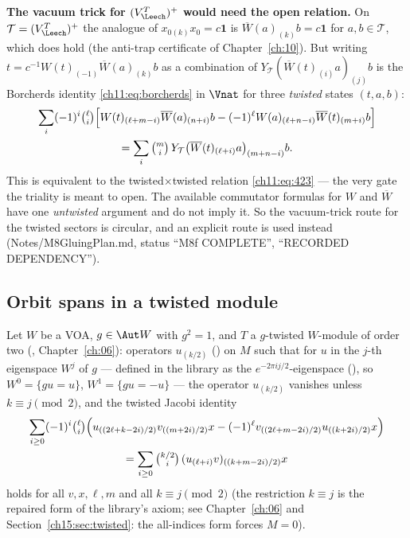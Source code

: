 \begin{warning}
\textbf{The vacuum trick for $(V_\Leech^T)^+$ would need the open relation.}  On $\mathcal
T=(V_\Leech^T)^+$ the analogue of $x_{0(k)}x_0=c\mathbf 1$ is $\overline W(a)_{(k)}b=c\mathbf 1$ for
$a,b\in\mathcal T$, which does hold (the anti-trap certificate 
of Chapter~\ref{ch:10}).  But writing $t=c^{-1}W(t)_{(-1)}\overline W(a)_{(k)}b$ as a combination of
$Y_{\mathcal T}(\overline W(t)_{(i)}a)_{(j)}b$ is the Borcherds identity \eqref{ch11:eq:borcherds} in
$\Vnat$ for three \emph{twisted} states $(t,a,b)$:
\begin{multline*}
  \sum_i(-1)^i\tbinom{\ell}{i}\Big[W(t)_{(\ell+m-i)}\overline W(a)_{(n+i)}b
   -(-1)^\ell W(a)_{(\ell+n-i)}\overline W(t)_{(m+i)}b\Big]\\
   =\sum_i\tbinom{m}{i}\,Y_{\mathcal T}\big(\overline W(t)_{(\ell+i)}a\big)_{(m+n-i)}b .
\end{multline*}
This is equivalent to the twisted$\times$twisted relation \eqref{ch11:eq:423} --- the very gate the
triality is meant to open.  The available commutator formulas for $W$ and $\overline W$ have one
\emph{untwisted} argument and do not imply it.  So the vacuum-trick route for the twisted sectors is
circular, and an explicit route is used instead (Notes/M8GluingPlan.md, status ``M8f COMPLETE'',
``RECORDED DEPENDENCY'').
\end{warning}

\subsection{Orbit spans in a twisted module}

Let $W$ be a VOA, $g\in\Aut W$ with $g^2=1$, and $T$ a $g$-twisted $W$-module of order two
(, Chapter~\ref{ch:06}): operators $u_{(k/2)}$ () on $M$
such that for $u$ in the $j$-th eigenspace $W^j$ of $g$ --- defined in the library as the
$e^{-2\pi i j/2}$-eigenspace (), so $W^0=\{gu=u\}$,
$W^1=\{gu=-u\}$ --- the operator $u_{(k/2)}$ vanishes unless $k\equiv j\pmod2$, and the twisted Jacobi
identity
\begin{multline*}
  \sum_{i\ge0}(-1)^i\tbinom{\ell}{i}\Big(u_{((2\ell+k-2i)/2)}v_{((m+2i)/2)}x
     -(-1)^\ell v_{((2\ell+m-2i)/2)}u_{((k+2i)/2)}x\Big)\\
  =\sum_{i\ge0}\tbinom{k/2}{i}\,(u_{(\ell+i)}v)_{((k+m-2i)/2)}x
\end{multline*}
holds for all $v,x,\ell,m$ and all $k\equiv j\pmod 2$ (the restriction $k\equiv j$ is the repaired
form of the library's axiom; see Chapter~\ref{ch:06} and Section~\ref{ch15:sec:twisted}: the all-indices form forces $M=0$).

